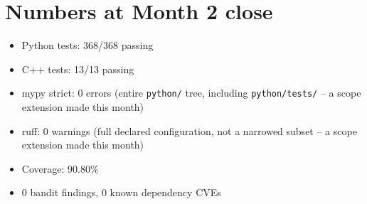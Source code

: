 \documentclass[11pt]{article}
\begin{document}
\section*{Numbers at Month 2 close}
\begin{itemize}[leftmargin=*]
  \item Python tests: 368/368 passing
  \item C++ tests: 13/13 passing
  \item mypy strict: 0 errors (entire \texttt{python/} tree, including
    \texttt{python/tests/} -- a scope extension made this month)
  \item ruff: 0 warnings (full declared configuration, not a narrowed
    subset -- a scope extension made this month)
  \item Coverage: 90.80\%
  \item 0 bandit findings, 0 known dependency CVEs
\end{itemize}
\end{document}
